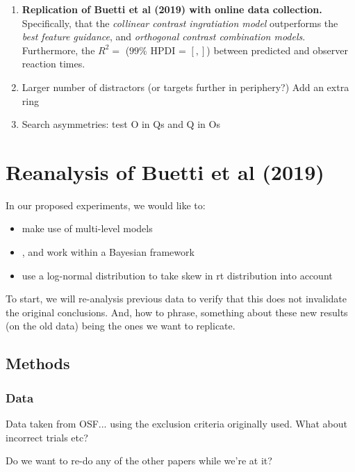 \documentclass[smallextended]{svjour3}       %
\begin{document}
\begin{enumerate}
\item \textbf{Replication of Buetti et al (2019) with online data collection.} Specifically, that the \textit{collinear contrast ingratiation model} outperforms the \textit{best feature guidance}, and \textit{orthogonal contrast combination models}.  Furthermore, the $R^2 = $ ($99\%$ HPDI = $[, ]$) between predicted and observer reaction times.\\
\item Larger number of distractors (or targets further in periphery?) Add an extra ring \\ 
\item Search asymmetries: test O in Qs and Q in Os \\
\end{enumerate}

\section{Reanalysis of Buetti et al (2019)}

In our proposed experiments, we would like to:
\begin{itemize} 
\item make use of multi-level models \\
\item, and work within a Bayesian framework \\
\item use a log-normal distribution to take skew in rt distribution into account \\
\end{itemize}

To start, we will re-analysis previous data to verify that this does not invalidate the original conclusions. And, how to phrase, something about these new results (on the old data) being the ones we want to replicate. 

\subsection{Methods}

\subsubsection{Data}

Data taken from OSF... using the exclusion criteria originally used. What about incorrect trials etc? 

Do we want to re-do any of the other papers while we're at it?
\end{document}
